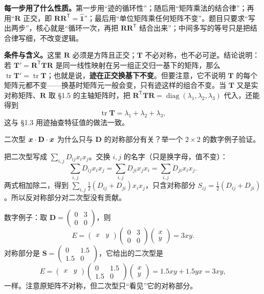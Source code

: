 \documentclass[11pt]{ctexart}
\newcommand{\ten}[1]{\mathbf{#1}}
\newcommand{\unitd}{\hat{\ten{1}}}
\newcommand{\tr}{\operatorname{tr}}
\begin{document}
\textbf{每一步用了什么性质。}第一步用“迹的循环性”；随后用“矩阵乘法的结合律”；再用“$\ten R$ 正交，即 $\ten R\ten R^{\mathsf T}=\unitd$”；最后用“单位矩阵乘任何矩阵不变”。题目只要求“写出两步”，核心就是“循环一次，再把 $\ten R\ten R^{\mathsf T}$ 结合出来”；中间多写的等号只是把结合律写细，不改变逻辑。

\textbf{条件与含义。}这里 $\ten R$ 必须是方阵且正交；$\ten T$ 不必对称，也不必可逆。结论说明：若 $\ten T'=\ten R^{\mathsf T}\ten T\ten R$ 是同一线性映射在另一组正交归一基下的矩阵，那么 $\tr\ten T'=\tr\ten T$；也就是说，\textbf{迹在正交换基下不变}。但要注意，它不说明 $\ten T$ 的每个矩阵元都不变——换基时矩阵元一般会变，只有迹这样的组合不变。当 $\ten T$ 又是实对称矩阵、$\ten R$ 取 \S1.5 的主轴矩阵时，把 $\ten R^{\mathsf T}\ten T\ten R=\operatorname{diag}(\lambda_1,\lambda_2,\lambda_3)$ 代入，还能得到
\[
\tr\ten T=\lambda_1+\lambda_2+\lambda_3,
\]
这与 \S1.3 用迹抽查特征值的做法一致。

{二次型 $\vect x\cdot\ten D\cdot\vect x$ 为什么只与 $\ten D$ 的对称部分有关？举一个 $2\times2$ 的数字例子验证。}

把二次型写成 $\sum_{i,j}D_{ij}x_ix_j$。交换 $i,j$ 的名字（只是换字母，值不变）：
\[
\sum_{i,j}D_{ij}x_ix_j=\sum_{i,j}D_{ji}x_jx_i=\sum_{i,j}D_{ji}x_ix_j .
\]
两式相加除二，得到 $\sum_{i,j}\frac12(D_{ij}+D_{ji})x_ix_j$，只含对称部分 $S_{ij}=\frac12(D_{ij}+D_{ji})$。所以反对称部分对二次型没有贡献。

数字例子：取 $\ten D=\begin{pmatrix}0&3\\0&0\end{pmatrix}$，则
\[
E=\begin{pmatrix}x&y\end{pmatrix}\begin{pmatrix}0&3\\0&0\end{pmatrix}\begin{pmatrix}x\\y\end{pmatrix}=3xy .
\]
对称部分是 $\ten S=\begin{pmatrix}0&1.5\\1.5&0\end{pmatrix}$，它给出的二次型是
\[
E=\begin{pmatrix}x&y\end{pmatrix}\begin{pmatrix}0&1.5\\1.5&0\end{pmatrix}\begin{pmatrix}x\\y\end{pmatrix}=1.5xy+1.5yx=3xy,
\]
一样。注意原矩阵不对称，但二次型只“看见”它的对称部分。
\end{document}
